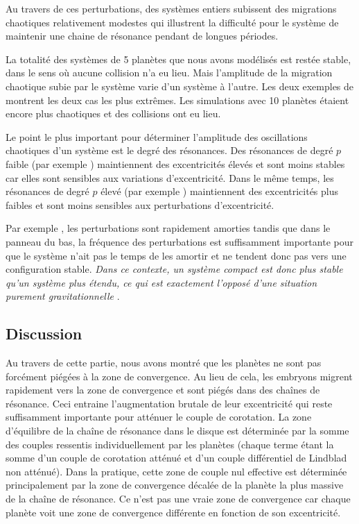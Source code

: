 Au travers de ces perturbations, des systèmes entiers subissent des migrations chaotiques relativement modestes qui illustrent la difficulté pour le système de maintenir une chaine de résonance pendant de longues périodes. 

La totalité des systèmes de 5 planètes que nous avons modélisés est restée stable, dans le sens où aucune collision n'a eu lieu. Mais l'amplitude de la migration chaotique subie par le système varie d'un système à l'autre. Les deux exemples de  montrent les deux cas les plus extrêmes. Les simulations avec 10 planètes étaient encore plus chaotiques et des collisions ont eu lieu. 

\bigskip

Le point le plus important pour déterminer l'amplitude des oscillations chaotiques d'un système est le degré des résonances. Des résonances de degré $p$ faible (par exemple ) maintiennent des excentricités élevés et sont moins stables car elles sont sensibles aux variations d'excentricité. Dans le même temps, les résonances de degré $p$ élevé (par exemple ) maintiennent des excentricités plus faibles et sont moins sensibles aux perturbations d'excentricité.

Par exemple , les perturbations sont rapidement amorties tandis que dans le panneau du bas, la fréquence des perturbations est suffisamment importante pour que le système n'ait pas le temps de les amortir et ne tendent donc pas vers une configuration stable. \emph{Dans ce contexte, un système compact est donc plus stable qu'un système plus étendu, ce qui est exactement l'opposé d'une situation purement gravitationnelle} \citep{marchal1982hill}.

\subsection{Discussion}
Au travers de cette partie, nous avons montré que les planètes ne sont pas forcément piégées à la zone de convergence. Au lieu de cela, les embryons migrent rapidement vers la zone de convergence et sont piégés dans des chaînes de résonance. Ceci entraine l'augmentation brutale de leur excentricité qui reste suffisamment importante pour atténuer le couple de corotation. La zone d'équilibre de la chaîne de résonance dans le disque est déterminée par la somme des couples ressentis individuellement par les planètes (chaque terme étant la somme d'un couple de corotation atténué et d'un couple différentiel de Lindblad non atténué). Dans la pratique, cette zone de couple nul effective est déterminée principalement par la zone de convergence décalée de la planète la plus massive de la chaîne de résonance. Ce n'est pas une vraie zone de convergence car chaque planète voit une zone de convergence différente en fonction de son excentricité.


